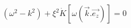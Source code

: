 \begin{equation}
({\omega}^{2}-k^{2})+{\xi}^{2}\dot{K}[{\omega}(\vec{k}.\vec{e_{z}})]= 0
\label{33}
\end{equation}

